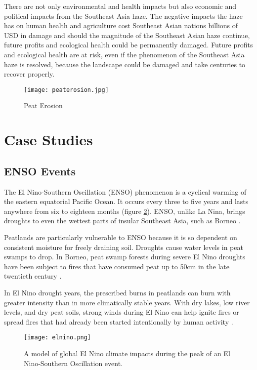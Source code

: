 There are not only environmental and health impacts but also economic and political impacts from the Southeast Asia haze. The negative impacts the haze has on human health and agriculture cost Southeast Asian nations billions of USD in damage and should the magnitude of the Southeast Asian haze continue, future profits and ecological health could be permanently damaged. Future profits and ecological health are at risk, even if the phenomenon of the Southeast Asia haze is resolved, because the landscape could be damaged and take centuries to recover properly.

\begin{figure}
  \texttt{[image: peaterosion.jpg]}
  \caption{Peat Erosion}
  \label{fig:peaterosion}
\end{figure}

\section{Case Studies}

\subsection{ENSO Events}

The El Nino-Southern Oscillation (ENSO) phenomenon is a cyclical warming of the eastern equatorial Pacific Ocean. It occurs every three to five years and lasts anywhere from six to eighteen months (figure \ref{fig:elnino}). ENSO, unlike La Nina, brings droughts to even the wettest parts of insular Southeast Asia, such as Borneo \citep{aiken2004runaway}.

Peatlands are particularly vulnerable to ENSO because it is so dependent on consistent moisture for freely draining soil. Droughts cause water levels in peat swamps to drop. In Borneo, peat swamp forests during severe El Nino droughts have been subject to fires that have consumed peat up to 50cm in the late twentieth century \citep{turetsky2015global}.

In El Nino drought years, the prescribed burns in peatlands can burn with greater intensity than in more climatically stable years. With dry lakes, low river levels, and dry peat soils, strong winds during El Nino can help ignite fires or spread fires that had already been started intentionally by human activity \citep{chokkalingam2005fire}.  

\begin{figure}
  \texttt{[image: elnino.png]}
  \caption{A model of global El Nino climate impacts during the peak of an El Nino-Southern Oscillation event.}
  \label{fig:elnino}
\end{figure}

